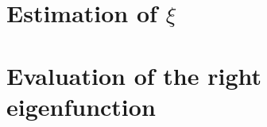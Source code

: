 \documentclass{article}
\theoremstyle{remark}
\begin{document}
\section{Estimation of $\xi$}

\section{Evaluation of the right eigenfunction}


\end{document}
